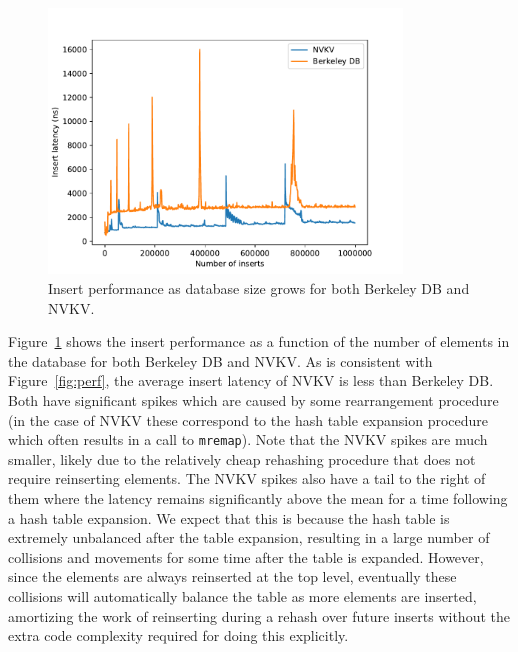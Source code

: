 \begin{figure}
\centering
\hspace*{-0.2in}
\includegraphics[width=94mm]{fig/line}
\caption{Insert performance as database size grows for both Berkeley DB and
NVKV.}
\label{fig:line}
\end{figure}

Figure~\ref{fig:line} shows the insert performance as a function of the number
of elements in the database for both Berkeley DB and NVKV. As is consistent with
Figure~\ref{fig:perf}, the average insert latency of NVKV is less than Berkeley
DB. Both have significant spikes which are caused by some rearrangement
procedure (in the case of NVKV these correspond to the hash table expansion
procedure which often results in a call to \texttt{mremap}).
Note that the NVKV spikes are much smaller, likely due to the
relatively cheap rehashing procedure that does not require reinserting elements.
The NVKV spikes also have a tail to the right of them where the latency remains
significantly above the mean for a time following a hash table expansion. We
expect that this is because the hash table is extremely unbalanced after the
table expansion, resulting in a large number of collisions and movements for
some time after the table is expanded. However, since the elements are always
reinserted at the top level, eventually these collisions will automatically
balance the table as more elements are inserted, amortizing the work of
reinserting during a rehash over future inserts without the extra code
complexity required for doing this explicitly.



